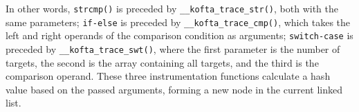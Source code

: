 In other words, \texttt{strcmp()} is preceded by \texttt{\_\_kofta\_trace\_str()}, both with the same parameters;
\texttt{if-else} is preceded by \texttt{\_\_kofta\_trace\_cmp()}, which takes the left and right operands of the comparison condition as arguments;
\texttt{switch-case} is preceded by \texttt{\_\_kofta\_trace\_swt()}, where the first parameter is the number of targets, the second is the array containing all targets, and the third is the comparison operand.
These three instrumentation functions calculate a hash value based on the passed arguments, forming a new node in the current linked list.

